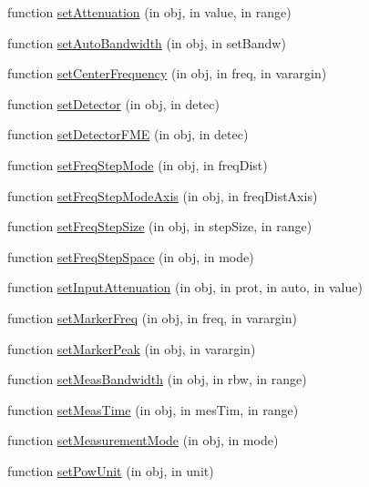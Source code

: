 \begin{DoxyCompactItemize}
function \hyperlink{class_e_s_r_p_a0fc4ffbb122ea79a98c42119e4fe3e15}{set\+Attenuation} (in obj, in value, in range)
\item 
function \hyperlink{class_e_s_r_p_a32da95474f8c88d4caacd4489880f58f}{set\+Auto\+Bandwidth} (in obj, in set\+Bandw)
\item 
function \hyperlink{class_e_s_r_p_a178b733fc18e7d4f89d19a3922c865fa}{set\+Center\+Frequency} (in obj, in freq, in varargin)
\item 
function \hyperlink{class_e_s_r_p_a3553693ba292f7d7d92bc8376fb81ee7}{set\+Detector} (in obj, in detec)
\item 
function \hyperlink{class_e_s_r_p_a92779b8db7f14f4552289996829bc6b7}{set\+Detector\+F\+ME} (in obj, in detec)
\item 
function \hyperlink{class_e_s_r_p_a89c19caff909595543621ef2c4094066}{set\+Freq\+Step\+Mode} (in obj, in freq\+Dist)
\item 
function \hyperlink{class_e_s_r_p_aa164139befa861b46715ec2ddc48e9bb}{set\+Freq\+Step\+Mode\+Axis} (in obj, in freq\+Dist\+Axis)
\item 
function \hyperlink{class_e_s_r_p_a1d493f7db474117cb21ff2a2fa6180db}{set\+Freq\+Step\+Size} (in obj, in step\+Size, in range)
\item 
function \hyperlink{class_e_s_r_p_a8afa654ca9dca8d2878bba896341e2e2}{set\+Freq\+Step\+Space} (in obj, in mode)
\item 
function \hyperlink{class_e_s_r_p_af6924f43812ce4a85cd99ad5e3fc4959}{set\+Input\+Attenuation} (in obj, in prot, in auto, in value)
\item 
function \hyperlink{class_e_s_r_p_a16fd603029e000cb4c272825cd3c37fd}{set\+Marker\+Freq} (in obj, in freq, in varargin)
\item 
function \hyperlink{class_e_s_r_p_a73ad144b7514efba0a1b232076bd4f7e}{set\+Marker\+Peak} (in obj, in varargin)
\item 
function \hyperlink{class_e_s_r_p_ad212dab3b9adc7a78c6454216c516cb6}{set\+Meas\+Bandwidth} (in obj, in rbw, in range)
\item 
function \hyperlink{class_e_s_r_p_a1324708a1e8fc81551a9c73a4eae70d1}{set\+Meas\+Time} (in obj, in mes\+Tim, in range)
\item 
function \hyperlink{class_e_s_r_p_a02bf692037b7413f1f00151500e2ad42}{set\+Measurement\+Mode} (in obj, in mode)
\item 
function \hyperlink{class_e_s_r_p_a1f3c898d9915aa76d0016a836bcb9016}{set\+Pow\+Unit} (in obj, in unit)
\item 

\end{DoxyCompactItemize}
